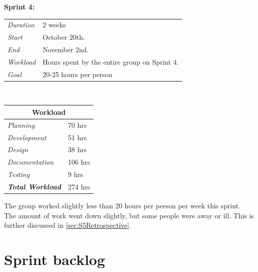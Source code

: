 \begin{minipage}{\linewidth}
\centering
\setlength{\tabcolsep}{22pt}
\textbf{Sprint 4:} 
\smallskip
{}
\begin{tabular}{ |l l| }
	\hline
	\it{Duration} & 2 weeks \\
	\it{Start} & October 20th. \\
	\it{End} & November 2nd. \\
	\it{Workload} & Hours spent by the entire group on Sprint 4. \\
	\it{Goal} & 20-25 hours per person \\
	\hline
\end{tabular}
\end{minipage}\\%
%
\begin{minipage}{\linewidth}
\setlength{\tabcolsep}{15pt}
\centering
{}
\begin{tabular}{ |l|l| }
	\hline
	\multicolumn{2}{|c|}{\cellcolor{gray!25} Workload} \\
	\hline
	\it{Planning} & 70 hrs\\
	\it{Development} & 51 hrs\\
	\it{Design} & 38 hrs\\
	\it{Documentation} & 106 hrs\\
	\it{Testing} & 9 hrs\\
	\hline
	\textbf{\textit{Total Workload}} & 274 hrs\\
	\hline
\end{tabular}
\end{minipage}

The group worked slightly less than 20 hours per person per week this sprint. The amount of work went down slightly, but some people were away or ill. This is further discussed in \ref{sec:S5Retrospective}.

\section{Sprint backlog}
\label{sec:S5Backlog}

